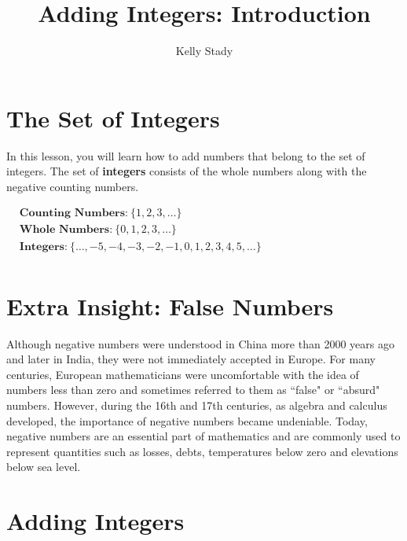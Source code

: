 \documentclass{ximera}[font=12pt]
\title{Adding Integers: Introduction}   %
\author{Kelly Stady}
\begin{document}
  


\begin{abstract}

\end{abstract}


\maketitle
\label{xim:AddIntroActivity}


\section*{The Set of Integers}

In this lesson, you will learn how to add numbers that belong to the set of integers.  The set of \textbf{integers} consists of the whole numbers along with the negative counting numbers.

\begin{flushleft}
\hspace{5em} %
$\begin{aligned}
& \textbf{Counting Numbers:} \ \{1, 2, 3, \dots\} \\[1.5ex]
& \textbf{Whole Numbers:} \ \{0, 1, 2, 3, \dots\} \\[1.5ex]
& \textbf{Integers:} \ \{ \ldots, -5, -4, -3, -2, -1, 0, 1, 2, 3, 4, 5, \ldots \} \\[1.5ex] 
\end{aligned}$
\end{flushleft}


\section*{Extra Insight: False Numbers}

\normalsize
Although negative numbers were understood in China more than 2000 years ago and later in India, they were not immediately accepted in Europe.
For many centuries, European mathematicians were uncomfortable with the idea of numbers less than zero and sometimes referred to them  as ``false" or
``absurd" numbers.  However, during the 16th and 17th centuries, as algebra and calculus developed, the importance of negative numbers became undeniable.
Today, negative numbers are an essential part of mathematics and are commonly used to represent quantities such as losses, debts, temperatures below zero and
elevations below sea level.

\section*{Adding Integers}
\end{document}
